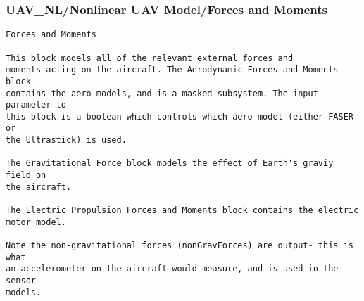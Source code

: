 \documentclass[12pt]{article}
\begin{document}
\subsubsection{UAV\_NL/Nonlinear UAV Model/Forces and Moments}
\begin{verbatim}
Forces and Moments

This block models all of the relevant external forces and
moments acting on the aircraft. The Aerodynamic Forces and Moments block
contains the aero models, and is a masked subsystem. The input parameter to
this block is a boolean which controls which aero model (either FASER or
the Ultrastick) is used.

The Gravitational Force block models the effect of Earth's graviy field on 
the aircraft.

The Electric Propulsion Forces and Moments block contains the electric
motor model.

Note the non-gravitational forces (nonGravForces) are output- this is what
an accelerometer on the aircraft would measure, and is used in the sensor
models.



\end{verbatim}
\end{document}
